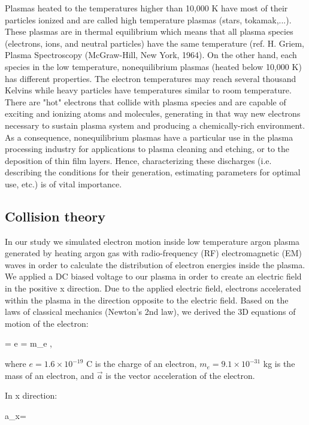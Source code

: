 \documentclass[12pt]{article}
\begin{document}
Plasmas heated to the temperatures higher than 10,000 K have most of their particles ionized and are called high temperature plasmas (stars, tokamak,...). These plasmas are in thermal equilibrium which means that all plasma species (electrons, ions, and neutral particles) have the same temperature (ref. H. Griem, Plasma Spectroscopy (McGraw-Hill, New York, 1964). On the other hand, each species in the low temperature, nonequilibrium plasmas (heated below 10,000 K) has different properties. The electron temperatures may reach several thousand Kelvins while heavy particles have temperatures similar to room temperature. There are "hot" electrons that collide with plasma species and are capable of exciting and ionizing atoms and molecules, generating in that way new electrons necessary to sustain plasma system and producing a chemically-rich environment. As a consequence, nonequilibrium plasmas have a particular use in the plasma processing industry for applications to plasma cleaning and etching, or to the deposition of thin film layers. Hence, characterizing these discharges (i.e. describing the conditions for their generation, estimating parameters for optimal use, etc.) is of vital importance. 


\subsection{Collision theory}

In our study we simulated electron motion inside low temperature argon plasma generated by heating argon gas with radio-frequency (RF) electromagnetic (EM) waves in order to calculate the distribution of electron energies inside the plasma. We applied a DC biased voltage to our plasma in order to create an electric field in the positive x direction. 
Due to the applied electric field, electrons accelerated within the plasma in the direction opposite to the electric field. Based on the laws of classical mechanics (Newton’s 2nd law), we derived the 3D equations of motion of the electron:

\beqn
{} = e = m_{e} ,
\label{Newtons 2nd law}
\eeqn

where $e = 1.6\times10^{-19}$ C is the charge of an electron, $m_{e} = 9.1\times10^{-31}$ kg is the mass of an electron, and $\vec{a}$ is the vector acceleration of the electron.

In x direction:

\beqn
a_x= 
\label{ForceChargeField}
\eeqn
\end{document}
